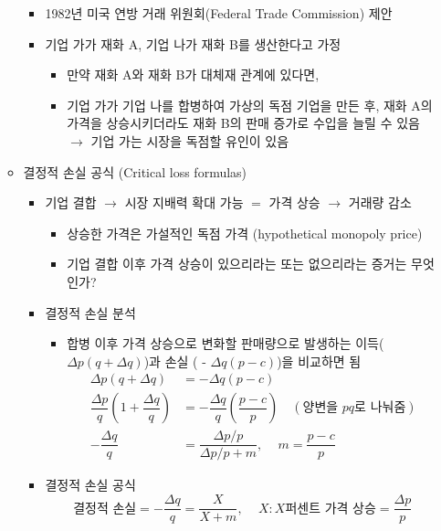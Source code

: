 \begin{itemize}
\begin{itemize}
		\begin{itemize}
		\item 1982년 미국 연방 거래 위원회(Federal Trade Commission) 제안
		\item 기업 가가 재화 A, 기업 나가 재화 B를 생산한다고 가정 
			\begin{itemize}
			\item 만약 재화 A와 재화 B가 대체재 관계에 있다면,
			\item 기업 가가 기업 나를 합병하여 가상의 독점 기업을 만든 후, 재화 A의 가격을 상승시키더라도 재화 B의 판매 증가로 수입을 늘릴 수 있음 $\rightarrow$ 기업 가는 시장을 독점할 유인이 있음
			\end{itemize}
		\end{itemize}
	\item 결정적 손실 공식 (Critical loss formulas) \citep{OBrien:2003us}
		\begin{itemize}
		\item 기업 결합 $\rightarrow$ 시장 지배력 확대 가능 $=$ 가격 상승 $\rightarrow$ 거래량 감소
			\begin{itemize}
			\item 상승한 가격은 가설적인 독점 가격 (hypothetical monopoly price)
			\item 기업 결합 이후 가격 상승이 있으리라는 또는 없으리라는 증거는 무엇인가?
			\end{itemize}
		\item 결정적 손실 분석
			\begin{itemize}
			\item 합병 이후 가격 상승으로 변화할 판매량으로 발생하는 이득($\Delta p (q+ \Delta q)$)과 손실 ( - $\Delta q (p-c)$)을 비교하면 됨
				\begin{align*}
				\Delta p (q+ \Delta q) & = - \Delta q (p-c) \\
				\dfrac{\Delta p}{q} \left( 1 + \dfrac{\Delta q} {q} \right) & = - \dfrac{\Delta q}{q} \left( \dfrac{p-c}{p} \right) \quad (\text{양변을 $pq$로 나눠줌}) \\
				- \dfrac{\Delta q}{q} & = \dfrac{\Delta p / p}{\Delta p / p+m}\text{, } \quad  m = \dfrac{p-c}{p}
				\end{align*}
			\end{itemize}	
		\item 결정적 손실 공식
			\begin{equation*}
			\text{결정적 손실} = - \dfrac{\Delta q}{q}  = \dfrac{X}{X+m}\text{, } \quad  X: X \text{퍼센트 가격 상승} = \dfrac{\Delta p}{p}
			\end{equation*}
		\end{itemize}
	\end{itemize}
\end{itemize}

